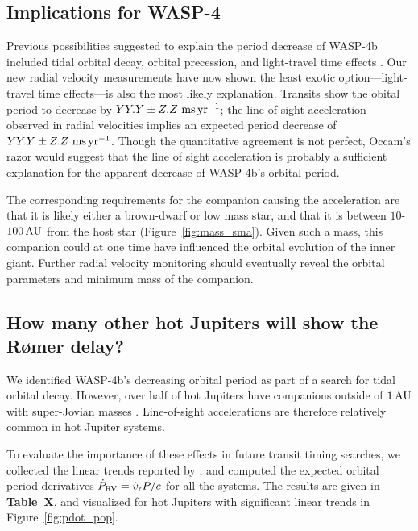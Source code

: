 \documentclass[12pt,twocolumn,tighten]{aastex62}
\begin{document}
\subsection{Implications for WASP-4}
Previous possibilities suggested to explain the period decrease of
WASP-4b included tidal orbital decay, orbital precession, and
light-travel time effects \citep{bouma_wasp4b_2019}.  Our new radial
velocity measurements have now shown the least exotic
option---light-travel time effects---is also the most likely
explanation.  Transits show the obital period to decrease by $YY.Y \pm
Z.Z~{\rm ms}\,{\rm yr}^{-1}$; the line-of-sight acceleration observed
in radial velocities implies an expected period decrease of $YY.Y \pm
Z.Z~{\rm ms}\,{\rm yr}^{-1}$.  
Though the quantitative agreement is not perfect, Occam's razor would
suggest that the line of sight acceleration is probably a sufficient
explanation for the apparent decrease of WASP-4b's orbital period.

The corresponding requirements for the companion causing the
acceleration are that it is likely either a brown-dwarf or low mass
star, and that it is between $10$-$100\,{\rm AU}$ from the host star
(Figure~\ref{fig:mass_sma}).
Given such a mass, this companion could at one time have influenced
the orbital evolution of the inner giant.
Further radial velocity monitoring should eventually reveal the
orbital parameters and minimum mass of the companion.

\subsection{How many other hot Jupiters will show the R{\o}mer delay?}

We identified WASP-4b's decreasing orbital period as part of a search
for tidal orbital decay.  However, over half of hot Jupiters have
companions outside of $1\,{\rm AU}$ with super-Jovian masses
\citep{knutson_friends_2014}.  Line-of-sight accelerations are
therefore relatively common in hot Jupiter systems. 

To evaluate the importance of these effects in future transit timing
searches, we collected the linear trends reported by
\citet{knutson_friends_2014}, and computed the expected orbital period
derivatives $\dot{P}_{\rm RV} = \dot{v}_{\rm r} P/c$ for all the
systems.
The results are given in {\bf Table~X}, and visualized for hot
Jupiters with significant linear trends in Figure~\ref{fig:pdot_pop}.
\end{document}
